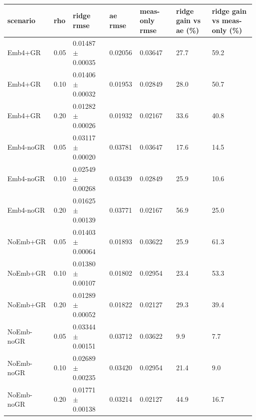 \begin{tabular}{lllllll}
\toprule
scenario & rho & ridge rmse & ae rmse & meas-only rmse & ridge gain vs ae (\%) & ridge gain vs meas-only (\%) \\
\midrule
Emb4+GR & 0.05 & 0.01487 $\pm$ 0.00035 & 0.02056 & 0.03647 & 27.7 & 59.2 \\
Emb4+GR & 0.10 & 0.01406 $\pm$ 0.00032 & 0.01953 & 0.02849 & 28.0 & 50.7 \\
Emb4+GR & 0.20 & 0.01282 $\pm$ 0.00026 & 0.01932 & 0.02167 & 33.6 & 40.8 \\
Emb4-noGR & 0.05 & 0.03117 $\pm$ 0.00020 & 0.03781 & 0.03647 & 17.6 & 14.5 \\
Emb4-noGR & 0.10 & 0.02549 $\pm$ 0.00268 & 0.03439 & 0.02849 & 25.9 & 10.6 \\
Emb4-noGR & 0.20 & 0.01625 $\pm$ 0.00139 & 0.03771 & 0.02167 & 56.9 & 25.0 \\
NoEmb+GR & 0.05 & 0.01403 $\pm$ 0.00064 & 0.01893 & 0.03622 & 25.9 & 61.3 \\
NoEmb+GR & 0.10 & 0.01380 $\pm$ 0.00107 & 0.01802 & 0.02954 & 23.4 & 53.3 \\
NoEmb+GR & 0.20 & 0.01289 $\pm$ 0.00052 & 0.01822 & 0.02127 & 29.3 & 39.4 \\
NoEmb-noGR & 0.05 & 0.03344 $\pm$ 0.00151 & 0.03712 & 0.03622 & 9.9 & 7.7 \\
NoEmb-noGR & 0.10 & 0.02689 $\pm$ 0.00235 & 0.03420 & 0.02954 & 21.4 & 9.0 \\
NoEmb-noGR & 0.20 & 0.01771 $\pm$ 0.00138 & 0.03214 & 0.02127 & 44.9 & 16.7 \\
\bottomrule
\end{tabular}
